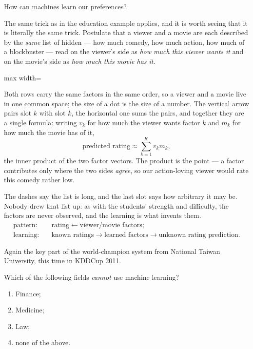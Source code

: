 \begin{question}
    How can machines learn our preferences?
\end{question}

The same trick as in the education example applies, and it is worth seeing that
it is literally the same trick. Postulate that a viewer and a movie are each
described by the \emph{same} list of hidden  --- how much comedy,
how much action, how much of a blockbuster --- read on the viewer's side as
\emph{how much this viewer wants it} and on the movie's side as \emph{how much
this movie has it}.

\begin{center}
    \begin{adjustbox}{max width=\textwidth}
        \recsysfactors
    \end{adjustbox}
\end{center}

Both rows carry the same factors in the same order, so a viewer and a movie
live in one common space; the size of a dot is the size of a number. The
vertical arrow pairs slot \(k\) with slot \(k\), the horizontal one sums the
pairs, and together they are a single formula: writing \(v_k\) for how much the
viewer wants factor \(k\) and \(m_k\) for how much the movie has of it,
\[
    \text{predicted rating} \approx \sum_{k=1}^{K} v_k m_k ,
\]
the inner product of the two factor vectors. The product is the point --- a
factor contributes only where the two sides \emph{agree}, so our
action-loving viewer would rate this comedy rather low.

The dashes say the list is long, and the last slot says how arbitrary it may
be. Nobody drew that list up: as with the students' strength and difficulty,
the factors are never observed, and the learning is what invents them.
\begin{align*}
    \text{pattern:} \quad & \text{rating} \longleftarrow
        \text{viewer/movie factors};\\
    \text{learning:} \quad & \text{known ratings} \longrightarrow
        \text{learned factors} \longrightarrow
        \text{unknown rating prediction}.
\end{align*}

\begin{moral}
    Again the key part of the world-champion system from National Taiwan
    University, this time in KDDCup 2011.
\end{moral}

\begin{exercise}
    Which of the following fields \emph{cannot} use machine learning?
    \begin{enumerate}[(1)]
        \item Finance;
        \item Medicine;
        \item Law;
        \item none of the above.
    \end{enumerate}
\end{exercise}


